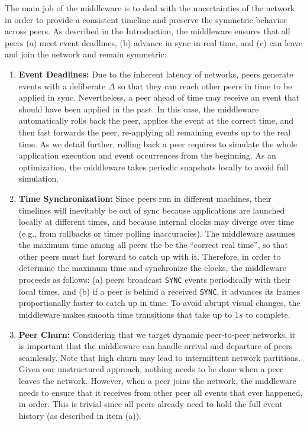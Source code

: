 \documentclass[10pt,journal,compsoc]{IEEEtran}
\newcommand{\code}[1]  {\texttt{\small{#1}}}
\begin{document}
The main job of the middleware is to deal with the uncertainties of the
network in order to provide a consistent timeline and preserve the symmetric
behavior across peers.
As described in the Introduction, the middleware ensures that all peers
    (a) meet event deadlines,
    (b) advance in sync in real time, and
    (c) can leave and join the network and remain symmetric:
%
\begin{enumerate}
\item \textbf{Event Deadlines:}
Due to the inherent latency of networks, peers generate events with a
deliberate $\Delta$ so that they can reach other peers in time to be applied in
sync.
Nevertheless, a peer ahead of time may receive an event that should have been
applied in the past. %
In this case, the middleware automatically rolls back the peer, applies the
event at the correct time, and then fast forwards the peer, re-applying all
remaining events up to the real time.
As we detail further, rolling back a peer requires to simulate the whole
application execution and event occurrences from the beginning.
As an optimization, the middleware takes periodic snapshots locally to avoid
full simulation.
%
\item \textbf{Time Synchronization:}
Since peers run in different machines, their timelines will inevitably be out
of sync because applications are launched locally at different times, and
because internal clocks may diverge over time (e.g., from rollbacks or timer
polling inaccuracies).
The middleware assumes the maximum time among all peers the be the
``correct real time'', so that other peers must fast forward to catch up with
it.
Therefore, in order to determine the maximum time and synchronize the clocks,
the middleware proceeds as follows:
    (a) peers broadcast \code{SYNC} events periodically with their local
        times, and
    (b) if a peer is behind a received \code{SYNC}, it advances its frames
        proportionally faster to catch up in time.
%
To avoid abrupt visual changes, the middleware makes smooth time transitions
that take up to $1s$ to complete.
%
\item \textbf{Peer Churn:}
Considering that we target dynamic peer-to-peer networks, it is important that
the middleware can handle arrival and departure of peers seamlessly.
Note that high churn may lead to intermittent network partitions.
Given our unstructured approach, nothing needs to be done when a peer leaves
the network.
However, when a peer joins the network, the middleware needs to ensure that it
receives from other peer all events that ever happened, in order.
This is trivial since all peers already need to hold the full event history (as
described in item (a)).
\end{enumerate}
\end{document}
